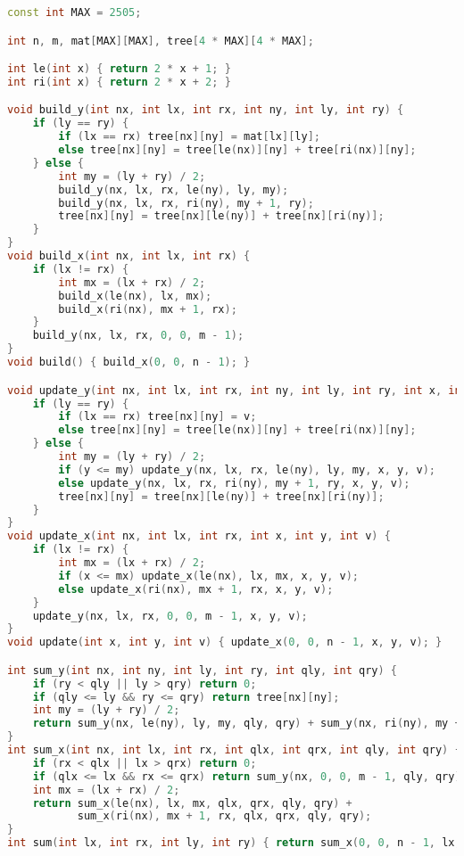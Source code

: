 \documentclass[10pt, a4paper, oneside]{book}
\begin{document}
\begin{lstlisting}[language=C++]
const int MAX = 2505;

int n, m, mat[MAX][MAX], tree[4 * MAX][4 * MAX];

int le(int x) { return 2 * x + 1; }
int ri(int x) { return 2 * x + 2; }

void build_y(int nx, int lx, int rx, int ny, int ly, int ry) {
    if (ly == ry) {
        if (lx == rx) tree[nx][ny] = mat[lx][ly];
        else tree[nx][ny] = tree[le(nx)][ny] + tree[ri(nx)][ny];
    } else {
        int my = (ly + ry) / 2;
        build_y(nx, lx, rx, le(ny), ly, my);
        build_y(nx, lx, rx, ri(ny), my + 1, ry);
        tree[nx][ny] = tree[nx][le(ny)] + tree[nx][ri(ny)];
    }
}
void build_x(int nx, int lx, int rx) {
    if (lx != rx) {
        int mx = (lx + rx) / 2;
        build_x(le(nx), lx, mx);
        build_x(ri(nx), mx + 1, rx);
    }
    build_y(nx, lx, rx, 0, 0, m - 1);
}
void build() { build_x(0, 0, n - 1); }

void update_y(int nx, int lx, int rx, int ny, int ly, int ry, int x, int y, int v) {
    if (ly == ry) {
        if (lx == rx) tree[nx][ny] = v;
        else tree[nx][ny] = tree[le(nx)][ny] + tree[ri(nx)][ny];
    } else {
        int my = (ly + ry) / 2;
        if (y <= my) update_y(nx, lx, rx, le(ny), ly, my, x, y, v);
        else update_y(nx, lx, rx, ri(ny), my + 1, ry, x, y, v);
        tree[nx][ny] = tree[nx][le(ny)] + tree[nx][ri(ny)];
    }
}
void update_x(int nx, int lx, int rx, int x, int y, int v) {
    if (lx != rx) {
        int mx = (lx + rx) / 2;
        if (x <= mx) update_x(le(nx), lx, mx, x, y, v);
        else update_x(ri(nx), mx + 1, rx, x, y, v);
    }
    update_y(nx, lx, rx, 0, 0, m - 1, x, y, v);
}
void update(int x, int y, int v) { update_x(0, 0, n - 1, x, y, v); }

int sum_y(int nx, int ny, int ly, int ry, int qly, int qry) {
    if (ry < qly || ly > qry) return 0;
    if (qly <= ly && ry <= qry) return tree[nx][ny];
    int my = (ly + ry) / 2;
    return sum_y(nx, le(ny), ly, my, qly, qry) + sum_y(nx, ri(ny), my + 1, ry, qly, qry);
}
int sum_x(int nx, int lx, int rx, int qlx, int qrx, int qly, int qry) {
    if (rx < qlx || lx > qrx) return 0;
    if (qlx <= lx && rx <= qrx) return sum_y(nx, 0, 0, m - 1, qly, qry);
    int mx = (lx + rx) / 2;
    return sum_x(le(nx), lx, mx, qlx, qrx, qly, qry) +
           sum_x(ri(nx), mx + 1, rx, qlx, qrx, qly, qry);
}
int sum(int lx, int rx, int ly, int ry) { return sum_x(0, 0, n - 1, lx, rx, ly, ry); }
\end{lstlisting}
\hfill
\end{document}
